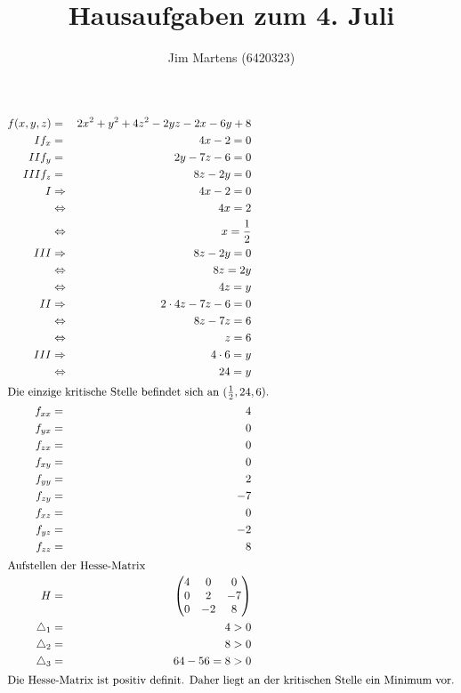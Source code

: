\documentclass[10pt,a4paper,oneside,ngerman,numbers=noenddot]{scrartcl}
\begin{document}
\author{Jim Martens (6420323)}
\title{Hausaufgaben zum 4. Juli}
\maketitle
\section{} %
\subsection{} %
\begin{alignat*}{2}
f(x,y,z) &=& 2x^{2} + y^{2} + 4z^{2} - 2yz - 2x - 6y + 8 \\
I f_{x} &=& 4x - 2 = 0\\
II f_{y} &=& 2y - 7z - 6 = 0\\
III f_{z} &=& 8z - 2y = 0 \\
I &\Rightarrow & 4x - 2 = 0 \\
&\Leftrightarrow & 4x = 2 \\
&\Leftrightarrow & x = \frac{1}{2} \\
III &\Rightarrow & 8z - 2y = 0 \\
&\Leftrightarrow & 8z = 2y \\
&\Leftrightarrow & 4z = y \\
II &\Rightarrow & 2 \cdot 4z - 7z - 6 = 0 \\
&\Leftrightarrow & 8z - 7z = 6 \\
&\Leftrightarrow & z = 6 \\
III &\Rightarrow & 4 \cdot 6 = y \\
&\Leftrightarrow & 24 = y \\
\intertext{Die einzige kritische Stelle befindet sich an ($\frac{1}{2}, 24, 6$).}
f_{xx} &=& 4 \\
f_{yx} &=& 0 \\
f_{zx} &=& 0 \\
f_{xy} &=& 0 \\
f_{yy} &=& 2 \\
f_{zy} &=& -7 \\
f_{xz} &=& 0 \\
f_{yz} &=& -2 \\
f_{zz} &=& 8 \\
\intertext{Aufstellen der Hesse-Matrix}
H &=& \begin{pmatrix}4 & 0 & 0 \\
0 & 2 & -7 \\
0 & -2 & 8\end{pmatrix} \\
\bigtriangleup_{1} &=& 4 > 0\\
\bigtriangleup_{2} &=& 8 > 0\\
\bigtriangleup_{3} &=& 64 - 56 = 8 > 0\\
\intertext{Die Hesse-Matrix ist positiv definit. Daher liegt an der kritischen Stelle ein Minimum vor.}
\end{alignat*}
\end{document}

